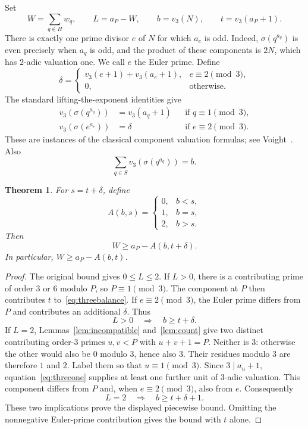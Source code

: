 \documentclass[11pt]{article}
\newtheorem{theorem}{Theorem}
\theoremstyle{remark}
\begin{document}
Set
\[
 W=\sum_{q\in H}w_q,\qquad L=a_P-W,\qquad
 b=v_3(N),\qquad t=v_3(a_P+1).
\]
There is exactly one prime divisor $e$ of $N$ for which $a_e$ is odd. Indeed,
$\sigma(q^{a_q})$ is even precisely when $a_q$ is odd, and the product of these
components is $2N$, which has $2$-adic valuation one. We call $e$ the Euler prime.
Define
\[
 \delta=\begin{cases}
 v_3(e+1)+v_3(a_e+1),& e\equiv2\pmod3,\\
 0,&\text{otherwise}.
 \end{cases}
\]
The standard lifting-the-exponent identities give
\begin{align}
 v_3(\sigma(q^{a_q}))&=v_3(a_q+1)
       &&\text{if }q\equiv1\pmod3,\label{eq:threeone}\\
 v_3(\sigma(e^{a_e}))&=\delta
       &&\text{if }e\equiv2\pmod3.\label{eq:threetwo}
\end{align}
These are instances of the classical component valuation formulas; see
Voight~\cite{Voight}. Also
\begin{equation}\label{eq:threebalance}
 \sum_{q\in S}v_3(\sigma(q^{a_q}))=b.
\end{equation}

\begin{theorem}\label{thm:three}
For $s=t+\delta$, define
\[
 A(b,s)=\begin{cases}
 0,& b<s,\\
 1,& b=s,\\
 2,& b>s.
 \end{cases}
\]
Then
\[
 \boxed{W\ge a_P-A(b,t+\delta).}
\]
In particular, $W\ge a_P-A(b,t)$.
\end{theorem}
\begin{proof}
The original bound gives $0\le L\le2$. If $L>0$, there is a contributing prime
of order $3$ or $6$ modulo $P$, so $P\equiv1\pmod3$. The component at $P$
then contributes $t$ to~\eqref{eq:threebalance}. If $e\equiv2\pmod3$, the Euler
prime differs from $P$ and contributes an additional $\delta$. Thus
\[
 L>0\quad\Longrightarrow\quad b\ge t+\delta.
\]
If $L=2$, Lemmas~\ref{lem:incompatible} and~\ref{lem:count} give two distinct
contributing order-$3$ primes $u,v<P$ with $u+v+1=P$. Neither is $3$: otherwise
the other would also be $0$ modulo $3$, hence also $3$. Their residues modulo $3$
are therefore $1$ and $2$. Label them so that $u\equiv1\pmod3$.
Since $3\mid a_u+1$, equation~\eqref{eq:threeone} supplies at least one further
unit of $3$-adic valuation. This component differs from $P$ and, when
$e\equiv2\pmod3$, also from $e$. Consequently
\[
 L=2\quad\Longrightarrow\quad b\ge t+\delta+1.
\]
These two implications prove the displayed piecewise bound. Omitting the
nonnegative Euler-prime contribution gives the bound with $t$ alone.
\end{proof}
\end{document}
